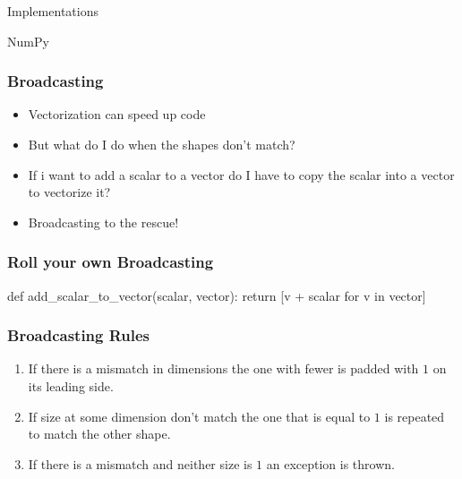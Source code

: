 \documentclass{beamer}
\theoremstyle{case}
\begin{document}
\begin{section}{Implementations}
\begin{subsection}{NumPy}
\begin{frame}
    \frametitle{Broadcasting}
    \begin{itemize}
        \item<1-> Vectorization can speed up code
        \item<2-> But what do I do when the shapes don't match?
        \item<3-> If i want to add a scalar to a vector do I have to copy the scalar into a vector to vectorize it?
        \item<4-> Broadcasting to the rescue!
    \end{itemize}
\end{frame}

\begin{frame}[fragile]
    \frametitle{Roll your own Broadcasting}
    \begin{pythoncode}
        def add_scalar_to_vector(scalar, vector):
            return [v + scalar for v in vector]
    \end{pythoncode}
\end{frame}

\begin{frame}
    \frametitle{Broadcasting Rules}
    \begin{enumerate}
        \item If there is a mismatch in dimensions the one with fewer is padded with $1$ on its leading side.
        \item If size at some dimension don't match the one that is equal to $1$ is repeated to match the other shape.
        \item If there is a mismatch and neither size is $1$ an exception is thrown.
    \end{enumerate}
\end{frame}


\end{subsection}
\end{section}
\end{document}
